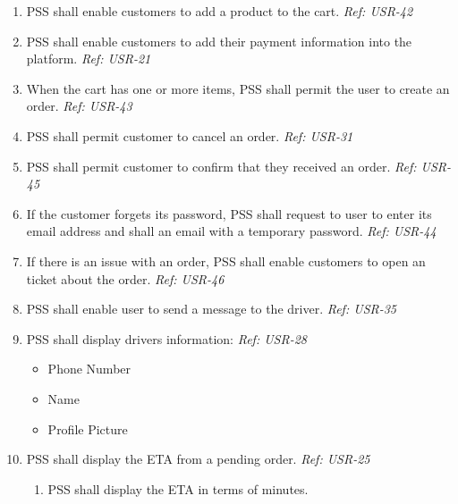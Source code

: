     \begin{enumerate}[resume, label=SY-\arabic*]
    \item PSS shall enable customers to add a product to the cart.
    \newline \textit{Ref: USR-42}
    \item PSS shall enable customers to add their payment information 
    into the platform.
    \newline \textit{Ref: USR-21}
    \item When the cart has one or more items, PSS shall permit the user to 
    create an order.
    \newline \textit{Ref: USR-43}
    \item PSS shall permit customer to cancel an order.
    \newline \textit{Ref: USR-31}
    \item PSS shall permit customer to confirm that they received an order.
    \newline \textit{Ref: USR-45}
    \item If the customer forgets its password, PSS shall request to user to 
    enter its email address and shall an email with a temporary password.
    \newline \textit{Ref: USR-44}
    \item If there is an issue with an order, PSS shall enable customers to 
    open an ticket about the order.
    \newline \textit{Ref: USR-46}
    \item PSS shall enable user to send a message to the driver.
    \newline \textit{Ref: USR-35}
    \item PSS shall display drivers information:
    \newline \textit{Ref: USR-28}
    \begin{itemize}
        \item Phone Number
        \item Name
        \item Profile Picture
    \end{itemize}
    \item PSS shall display the ETA from a pending order.
    \newline \textit{Ref: USR-25}
    \begin{enumerate}[label=SY-21.\arabic*]
        \item PSS shall display the ETA in terms of minutes.
    \end{enumerate}

\end{enumerate}
